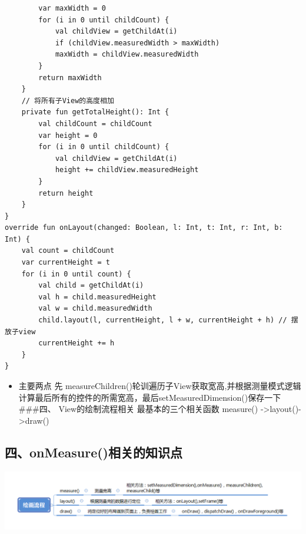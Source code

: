 \documentclass[9pt, b5paper]{article}
\begin{document}
\begin{verbatim}
        var maxWidth = 0
        for (i in 0 until childCount) {
            val childView = getChildAt(i)
            if (childView.measuredWidth > maxWidth)
            maxWidth = childView.measuredWidth
        }
        return maxWidth
    }
    // 将所有子View的高度相加
    private fun getTotalHeight(): Int {
        val childCount = childCount
        var height = 0
        for (i in 0 until childCount) {
            val childView = getChildAt(i)
            height += childView.measuredHeight
        }
        return height
    }
}
override fun onLayout(changed: Boolean, l: Int, t: Int, r: Int, b: Int) {
    val count = childCount
    var currentHeight = t
    for (i in 0 until count) {
        val child = getChildAt(i)
        val h = child.measuredHeight
        val w = child.measuredWidth
        child.layout(l, currentHeight, l + w, currentHeight + h) // 摆放子view
        currentHeight += h
    }
}
\end{verbatim}
\begin{itemize}
\item 主要两点 先 measureChildren()轮训遍历子View获取宽高,并根据测量模式逻辑计算最后所有的控件的所需宽高，最后setMeasuredDimension()保存一下 \#\#\#四、 View的绘制流程相关 最基本的三个相关函数 measure() ->layout()->draw()
\end{itemize}

\subsection{四、onMeasure()相关的知识点}
\label{sec-1-4}

\includegraphics[width=.9\linewidth]{./pic/onmeasure.png}
\end{document}
